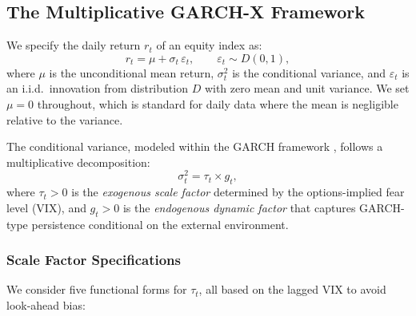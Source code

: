 \documentclass[12pt,a4paper]{article}
\begin{document}
\subsection{The Multiplicative GARCH-X Framework}
\label{sec:model_framework}

We specify the daily return $r_t$ of an equity index as:
\begin{equation}
r_t = \mu + \sigma_t \, \varepsilon_t, \qquad \varepsilon_t \sim D(0,1),
\label{eq:return}
\end{equation}
where $\mu$ is the unconditional mean return, $\sigma_t^2$ is the conditional variance, and $\varepsilon_t$ is an i.i.d.\ innovation from distribution $D$ with zero mean and unit variance. We set $\mu = 0$ throughout, which is standard for daily data where the mean is negligible relative to the variance.

The conditional variance, modeled within the GARCH framework \citep{engle1982, bollerslev1986}, follows a multiplicative decomposition:
\begin{equation}
\sigma_t^2 = \tau_t \times g_t,
\label{eq:mult}
\end{equation}
where $\tau_t > 0$ is the \emph{exogenous scale factor} determined by the options-implied fear level (VIX), and $g_t > 0$ is the \emph{endogenous dynamic factor} that captures GARCH-type persistence conditional on the external environment.

\subsubsection{Scale Factor Specifications}

We consider five functional forms for $\tau_t$, all based on the lagged VIX to avoid look-ahead bias:
\end{document}
